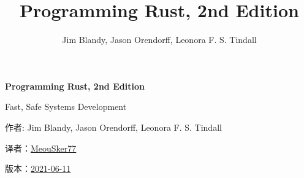 \documentclass[10pt,oneside]{book}
\title{Programming Rust, 2nd Edition}
\author{Jim Blandy, Jason Orendorff, Leonora F. S. Tindall}
\begin{document}
\frontmatter
\begin{titlepage}
  \centering
  {\Huge\bfseries Programming Rust, 2nd Edition\par}
  \vspace{1em}
  {\Large Fast, Safe Systems Development\par}
  \vspace{2em}
  {作者: Jim Blandy, Jason Orendorff, Leonora F. S. Tindall\par}
  \vspace{1em}
  {译者：\href{https://github.com/MeouSker77/ProgrammingRust}{MeouSker77}\par}
  \vspace{1em}
  {版本：\href{https://www.oreilly.com/library/view/programming-rust-2nd/9781492052586/}{2021-06-11}\par}
\end{titlepage}
\setcounter{secnumdepth}{0}
\tableofcontents



\mainmatter
\setcounter{secnumdepth}{2}























\backmatter
\end{document}
